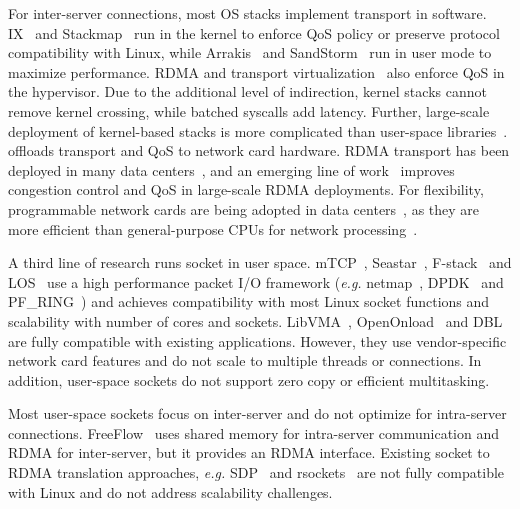 For inter-server connections, most OS stacks implement transport in software. IX~\cite{belay2017ix} and Stackmap~\cite{yasukata2016stackmap} run in the kernel to enforce QoS policy or preserve protocol compatibility with Linux, while Arrakis~\cite{peter2016arrakis} and SandStorm~\cite{marinos2014network} run in user mode to maximize performance.
RDMA and transport virtualization~\cite{tsai2017lite,niu2017network} also enforce QoS in the hypervisor.
Due to the additional level of indirection, kernel stacks cannot remove kernel crossing, while batched syscalls add latency.
Further, large-scale deployment of kernel-based stacks is more complicated than user-space libraries~\cite{andromeda}.
\sys offloads transport and QoS to network card hardware.
RDMA transport has been deployed in many data centers~\cite{guo2016rdma}, and an emerging line of work~\cite{zhu2015congestion,lu2017memory,mprdma} improves congestion control and QoS in large-scale RDMA deployments.
For flexibility, programmable network cards are being adopted in data centers~\cite{smartnic,cavium}, as they are more efficient than general-purpose CPUs for network processing~\cite{kaufmann2015flexnic,li2016clicknp}.

A third line of research runs socket in user space.
mTCP~\cite{jeong2014mtcp}, Seastar~\cite{seastar}, 
F-stack~\cite{fstack} and LOS~\cite{huang2017high} use a high performance packet I/O framework (\textit{e.g.} netmap~\cite{rizzo2012netmap}, DPDK~\cite{dpdk} and PF\_RING~\cite{pf-ring}) and achieves compatibility with most Linux socket functions and scalability with number of cores and sockets.
LibVMA~\cite{libvma}, OpenOnload~\cite{openonload} and DBL~\cite{dbl} are fully compatible with existing applications. However, they use vendor-specific network card features and do not scale to multiple threads or connections.
In addition, user-space sockets do not support zero copy or efficient multitasking.

Most user-space sockets focus on inter-server and do not optimize for intra-server connections.
FreeFlow~\cite{freeflow} uses shared memory for intra-server communication and RDMA for inter-server, but it provides an RDMA interface.
Existing socket to RDMA translation approaches, \textit{e.g.} SDP~\cite{socketsdirect} and rsockets~\cite{rsockets} are not fully compatible with Linux and do not address scalability challenges.

\fi